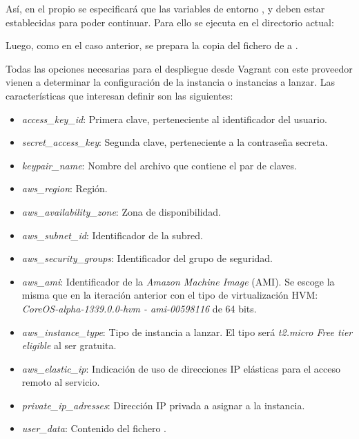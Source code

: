 Así, en el propio  se especificará que las variables de entorno ,  y  deben estar establecidas para poder continuar. Para ello se ejecuta en el directorio actual:


Luego, como en el caso anterior, se prepara la copia del fichero  de  a .

Todas las opciones necesarias para el despliegue desde Vagrant con este proveedor vienen a determinar la configuración de la instancia o instancias a lanzar. Las características que interesan definir son las siguientes:
\begin{itemize}
\item \textit{access\_key\_id}: Primera clave, perteneciente al identificador del usuario.
\item \textit{secret\_access\_key}: Segunda clave, perteneciente a la contraseña secreta.
\item \textit{keypair\_name}: Nombre del archivo que contiene el par de claves.
\item \textit{aws\_region}: Región.
\item \textit{aws\_availability\_zone}: Zona de disponibilidad.
\item \textit{aws\_subnet\_id}: Identificador de la subred.
\item \textit{aws\_security\_groups}: Identificador del grupo de seguridad.
\item \textit{aws\_ami}: Identificador de la \textit{Amazon Machine Image} (AMI). Se escoge la misma que en la iteración anterior con el tipo de virtualización HVM: \textit{CoreOS-alpha-1339.0.0-hvm - ami-00598116} de 64 bits.
\item \textit{aws\_instance\_type}: Tipo de instancia a lanzar. El tipo será \textit{t2.micro Free tier eligible} al ser gratuita.
\item \textit{aws\_elastic\_ip}: Indicación de uso de direcciones IP elásticas para el acceso remoto al servicio.
\item \textit{private\_ip\_adresses}: Dirección IP privada a asignar a la instancia.
\item \textit{user\_data}: Contenido del fichero .
\end{itemize}

